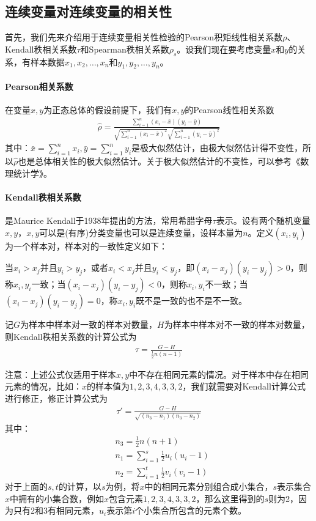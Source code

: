     \subsection{连续变量对连续变量的相关性}
        \par
        首先，我们先来介绍用于连续变量相关性检验的Pearson积矩线性相关系数$\rho$、Kendall秩相关系数$\tau$和Spearman秩相关系数$\rho_s$。设我们现在要考虑变量$x$和$y$的关系，有样本数据$x_1,x_2,\dots,x_n$和$y_1,y_2,\dots,y_n$。
        \paragraph{Pearson相关系数}在变量$x,y$为正态总体的假设前提下，我们有$x,y$的Pearson线性相关系数
        \begin{align*}
        \hat{\rho} = \frac{\sum\limits_{i=1}^n(x_i-\bar{x})(y_i-\bar{y})}{\sqrt{\sum\limits_{i=1}^n(x_i-\bar{x})^2}\sqrt{\sum\limits_{i=1}^n(y_i-\bar{y})^2}}
        \end{align*}
        其中：$\bar{x} = \sum_{i=1}^nx_i,\bar{y} = \sum_{i=1}^ny_i$是极大似然估计，由极大似然估计得不变性，所以$\hat{\rho} $也是总体相关性的极大似然估计。关于极大似然估计的不变性，可以参考《数理统计学》。
        \paragraph{Kendall秩相关系数}是Maurice Kendall于1938年提出的方法，常用希腊字母$\tau$表示。设有两个随机变量$x,y$，$x,y$可以是(有序)分类变量也可以是连续变量，设样本量为$n$。定义$(x_i,y_i)$为一个样本对，样本对的一致性定义如下：
        \begin{definition}[样本对的一致性]
        当$x_i>x_j$并且$y_i>y_j$，或者$x_i<x_j$并且$y_i<y_j$，即$(x_i-x_j)(y_i-y_j)>0$，则称$x_i,y_i$一致；当$(x_i-x_j)(y_i-y_j)<0$，则称$x_i,y_i$不一致；当$(x_i-x_j)(y_i-y_j)=0$，称$x_i,y_i$既不是一致的也不是不一致。
        \end{definition}
        \par
        记$G$为样本中样本对一致的样本对数量，$H$为样本中样本对不一致的样本对数量，则Kendall秩相关系数的计算公式为
        \begin{align*}
        \tau = \frac{G-H}{\frac{1}{2}{n(n-1)}}
        \end{align*}
        \par
        注意：上述公式仅适用于样本$x,y$中不存在相同元素的情况。对于样本中存在相同元素的情况，比如：$x$的样本值为$1, 2, 3, 4, 3, 3, 2$，我们就需要对Kendall计算公式进行修正，修正计算公式为
        \begin{align*}
        \tau' = \frac{G-H}{\sqrt{(n_3-n_1)(n_3-n_2)}}
        \end{align*}
        其中：
        \begin{align*}
        &n_3= \frac{1}{2}n(n+1)\\
        &n_1 = \sum_{i=1}^s\frac{1}{2}u_i(u_i-1)\\
        &n_2 = \sum_{i=1}^t\frac{1}{2}v_i(v_i-1)
        \end{align*}
        对于上面的$s,t$的计算，以$s$为例，将$x$中的相同元素分别组合成小集合，$s$表示集合$x$中拥有的小集合数，例如$x$包含元素$1, 2, 3, 4, 3, 3, 2$，那么这里得到的$s$则为2，因为只有2和3有相同元素，$u_i$表示第$i$个小集合所包含的元素个数。

